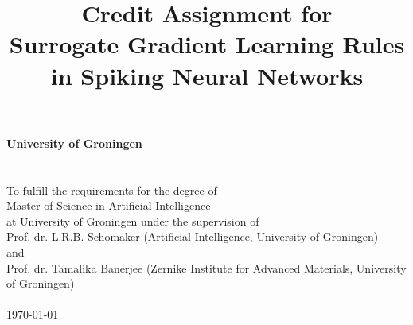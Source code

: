 \documentclass[a4paper,12pt,twoside]{article}
\begin{document}
\pagestyle{body}


\title{
    \vspace{5cm}
        {\bf
        {\Huge Credit Assignment for\\
        \vspace{2mm}Surrogate Gradient Learning Rules\\
        \vspace{4mm}in Spiking Neural Networks}
        }\\
        \vspace{10cm}{\LARGE Manvi Agarwal}
}
\date{}

\maketitle
\thispagestyle{titlepage}


\newpage

\thispagestyle{titlepage}

\vspace*{4cm}

\begin{center}
    {\bf{\large University of Groningen}}\\
    \\
    \vspace{2cm}{\bf Master's Thesis}\\
    \vspace{0.5cm}To fulfill the requirements for the degree of\\Master of Science in Artificial Intelligence\\
    at University of Groningen under the supervision of\\
    Prof. dr. L.R.B. Schomaker (Artificial Intelligence, University of Groningen)\\
    and\\
    Prof. dr. Tamalika Banerjee (Zernike Institute for Advanced Materials, University of Groningen)\\
    \vspace{3cm}{\bf Manvi Agarwal (s1234567)}\\
    \vspace{4cm}\today
    
\end{center}

\newpage

\setlength{\headheight}{32pt}

\thispagestyle{acknowledgements}    %




\pagestyle{body}


\pagestyle{contents}



%
\end{document}
